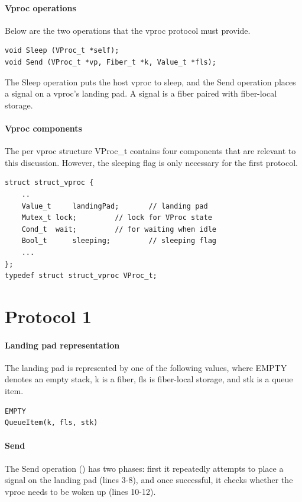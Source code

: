 \documentclass[11pt]{article}
\begin{document}
\paragraph{Vproc operations}
Below are the two operations that the vproc protocol must provide.
\lstset{language=C}
\lstset{commentstyle=\textit}
\begin{lstlisting}
void Sleep (VProc_t *self);
void Send (VProc_t *vp, Fiber_t *k, Value_t *fls);
\end{lstlisting}
The Sleep operation puts the host vproc to sleep, and the Send operation places a signal on a
vproc's landing pad.
A signal is a fiber paired with fiber-local storage.

\paragraph{Vproc components}
The per vproc structure VProc\_t contains four components that are relevant to this discussion.
However, the sleeping flag is only necessary for the first protocol.
\lstset{language=C}
\lstset{commentstyle=\textit}
\begin{lstlisting}
struct struct_vproc {
    ..
    Value_t     landingPad;       // landing pad
    Mutex_t	lock;  		  // lock for VProc state
    Cond_t	wait;		  // for waiting when idle
    Bool_t      sleeping;         // sleeping flag
    ...
};
typedef struct struct_vproc VProc_t;
\end{lstlisting}

\section{Protocol 1}\label{sec:protocol1}

\paragraph{Landing pad representation}
The landing pad is represented by one of the following values, where EMPTY
denotes an empty stack, k is a fiber, fls is fiber-local storage, and stk
is a queue item.
\lstset{language=C}
\lstset{commentstyle=\textit}
\begin{lstlisting}
EMPTY
QueueItem(k, fls, stk)
\end{lstlisting}

\paragraph{Send}
The Send operation () has two phases: first it repeatedly attempts to place a
signal on the landing pad (lines 3-8), and once successful, it checks
whether the vproc needs to be woken up (lines 10-12).
\end{document}
